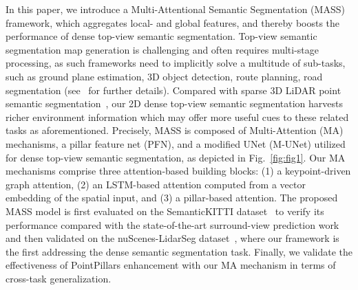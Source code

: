 \documentclass[lettersize,journal]{IEEEtran}
\begin{document}
In this paper, we introduce a Multi-Attentional Semantic Segmentation (MASS) framework, which aggregates local- and global features, and thereby boosts the performance of dense top-view semantic segmentation.
Top-view semantic segmentation map generation is challenging and often requires multi-stage processing, as such frameworks need to implicitly solve a multitude of sub-tasks, such as ground plane estimation, 3D object detection, route planning, road segmentation (see~\cite{predicting_semantic_map} for further details).
Compared with sparse 3D LiDAR point semantic segmentation~\cite{gndnet}, our 2D dense top-view semantic segmentation harvests richer environment information which may offer more useful cues to these related tasks as aforementioned.
Precisely, MASS is composed of Multi-Attention (MA) mechanisms, a pillar feature net (PFN), and a modified UNet (M-UNet) utilized for dense top-view semantic segmentation, as depicted in Fig.~\ref{fig:fig1}.
Our MA mechanisms comprise three attention-based building blocks: (1) a keypoint-driven graph attention, (2) an LSTM-based attention computed from a vector embedding of the spatial input, and (3) a pillar-based attention.
The proposed MASS model is first evaluated on the SemanticKITTI dataset~\cite{semantic_kitti} to verify its performance compared with the state-of-the-art surround-view prediction work~\cite{bieder2020exploiting} and then validated on the nuScenes-LidarSeg dataset~\cite{nuscenes}, where our framework is the first addressing the dense semantic segmentation task.
Finally,  we validate the effectiveness of PointPillars enhancement with our MA mechanism in terms of cross-task generalization.
\end{document}
